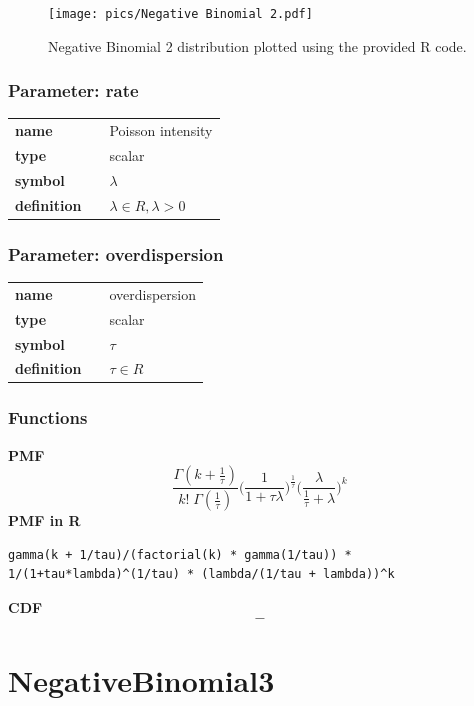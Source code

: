 \documentclass{article}
\begin{document}
\begin{figure}[ht!]
\centering
  \texttt{[image: pics/Negative Binomial 2.pdf]}
 \caption{Negative Binomial 2 distribution plotted using the provided R code.}
 \label{fig:Negative Binomial 2}
\end{figure}

\subsubsection*{Parameter: rate}

\noindent\begin{tabular}{p{2cm}cl}
\textbf{name} & & Poisson intensity \\
\textbf{type} & & scalar \\
\textbf{symbol} & & $\lambda$  \\
\textbf{definition} & & $\lambda \in R, \lambda > 0$
\end{tabular}
\subsubsection*{Parameter: overdispersion}

\noindent\begin{tabular}{p{2cm}cl}
\textbf{name} & & overdispersion \\
\textbf{type} & & scalar \\
\textbf{symbol} & & $\tau$  \\
\textbf{definition} & & $\tau \in R$
\end{tabular}
\subsubsection*{Functions}

\smallskip \noindent \hspace{.2cm} \textbf{PMF} 
\begin{equation*}\frac{\Gamma(k + \frac{1}{\tau})}{k!\; \Gamma(\frac{1}{\tau})} \Big(\frac{1}{1+\tau \lambda} \Big)^{\frac{1}{\tau}} 
\Big(\frac{\lambda}{\frac{1}{\tau} + \lambda} \Big)^{k}\end{equation*}
\smallskip \noindent \hspace{.2cm} \textbf{PMF in R}  
\begin{verbatim}gamma(k + 1/tau)/(factorial(k) * gamma(1/tau)) * 1/(1+tau*lambda)^(1/tau) * (lambda/(1/tau + lambda))^k\end{verbatim}
\smallskip \noindent \hspace{.2cm} \textbf{CDF} 
\begin{equation*}-\end{equation*}
\smallskip\section*{NegativeBinomial3} 
\end{document}
